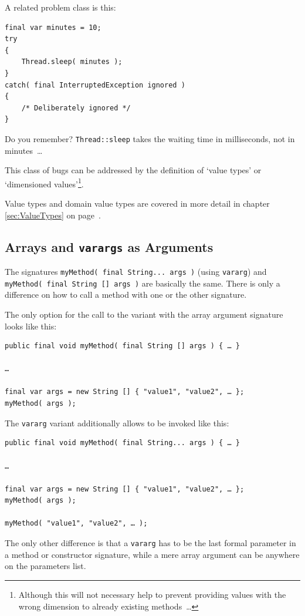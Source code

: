 \documentclass[11pt,a4paper, titlepage, parskip=half, headsepline, footsepline, cleardoublepage=current, headheight=1cm]{scrbook}
\newcommand*{\tqvref}[1]{\hyperref[{#1}]{\ref*{#1}} on page~\pageref{#1}}
\begin{document}
A related problem class is this:
\begin{lstlisting}
final var minutes = 10;
try
{
    Thread.sleep( minutes );
}
catch( final InterruptedException ignored )
{
    /* Deliberately ignored */
}
\end{lstlisting}
Do you remember? \lstinline|Thread::sleep| takes the waiting time in milliseconds, not in minutes~…

This class of bugs can be addressed by the definition of ‘value types’ or ‘dimensioned values’\footnote{Although this will not necessary help to prevent providing values with the wrong dimension to already existing methods~…}. 

Value types and domain value types are covered in more detail in chapter \tqvref{sec:ValueTypes}.


\subsection{Arrays and \lstinline|varargs| as Arguments}
The signatures \lstinline|myMethod( final String... args )| (using \verb#vararg#) and \lstinline|myMethod( final String [] args )| are basically the same. There is only a difference on how to call a method with one or the other signature.

The only option for the call to the variant with the array argument signature looks like this:
\begin{lstlisting}
public final void myMethod( final String [] args ) { … }

…

final var args = new String [] { "value1", "value2", … };
myMethod( args ); 
\end{lstlisting}

The \verb#vararg# variant additionally allows to be invoked like this:
\begin{lstlisting}
public final void myMethod( final String... args ) { … }

…

final var args = new String [] { "value1", "value2", … };
myMethod( args ); 

myMethod( "value1", "value2", … );
\end{lstlisting}

The only other difference is that a \verb#vararg# has to be the last formal parameter in a method or constructor signature, while a mere array argument can be anywhere on the parameters list.
\end{document}
